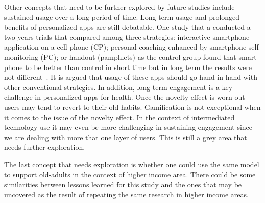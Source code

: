 Other concepts that need to be further explored by future studies include sustained usage over a long period of time. Long term usage and prolonged benefits of personalized apps are still debatable. One study that a conducted a two years trials that compared among three strategies: interactive smartphone application on a cell phone (CP); personal coaching enhanced by smartphone self-monitoring (PC); or handout (pamphlets) as the control group found that smart-phone to be better than control in short time but in long term the results were not different~\citep{svetkey2015cell}. It is argued that usage of these apps should go hand in hand with other conventional strategies. In addition,  long  term engagement is a key challenge in personalized apps for health. Once the novelty effect is worn out users may tend to revert to their old habits. Gamification is not exceptional when it comes to the issue of the novelty effect. In the context of intermediated technology use it may even be more challenging in sustaining engagement since we are dealing with more that one layer of users. This is still a grey area that needs further exploration.

The last concept that needs exploration is whether one could use the same model to support old-adults in the context of higher income area. There could be some similarities between lessons learned for this study and the ones that may be uncovered as the result of repeating the same research  in higher income areas.
\begin{flushright}
\end{flushright}
